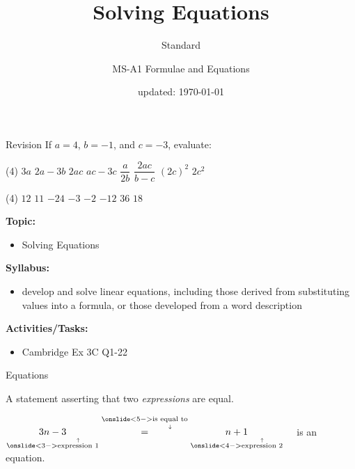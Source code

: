 \documentclass[aspectratio=169,10pt]{beamer}
\title{Solving Equations}
\subtitle{Standard}
\author{MS-A1 Formulae and Equations}
\date{updated: \today
}
\begin{document}
\begin{frame}{Revision}
  If $a=4$, $b=-1$, and $c=-3$, evaluate:
  \begin{tasks}(4)
  \task $3a$
  \task $2a-3b$
  \task $2ac$
  \task $ac-3c$
  \task $\dfrac{a}{2b}$
  \task $\dfrac{2ac}{b-c}$
  \task $(2c)^2$
  \task $2c^2$
  \end{tasks}\vspace{7pt}\pause
  \begin{solution}[]
    \begin{tasks}(4)
    \task \pause$12$
    \task \pause$11$
    \task \pause$-24$
    \task \pause$-3$
    \task \pause$-2$
    \task \pause$-12$
    \task \pause$36$
    \task \pause$18$
    \end{tasks}
    \end{solution}
\end{frame}

\frame{\titlepage}

\begin{frame}
  \begin{outcome}
    \textbf{Topic:}
    \begin{itemize}
      \item[] Solving Equations
    \end{itemize}

    \textbf{Syllabus:}
    \begin{itemize}
      \item develop and solve linear equations, including those derived from substituting values into a formula, or those developed from a word description
    \end{itemize}

    \textbf{Activities/Tasks:}
    \begin{itemize}
      \item Cambridge Ex 3C Q1-22
    \end{itemize}
  \end{outcome}
\end{frame}

\begin{frame}{Equations}
  \begin{definition}[Equation]
    A statement asserting that two \textit{expressions} are equal.
  \end{definition}\pause
  \begin{center}
    $\underset{\onslide<3->{\overset{\uparrow}{\text{expression 1}}}}{3n-3}\overset{\onslide<5->{\underset{\downarrow}{\text{is equal to}}}}{=}\underset{\onslide<4->{\overset{\uparrow}{\text{expression 2}}}}{n+1}\quad$ is an equation.
  \end{center}
\end{frame}
\end{document}
